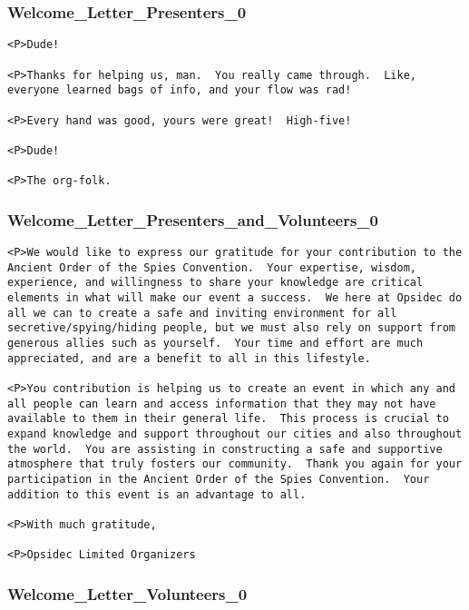 \documentclass[tablesignature]{scrartcl}
\begin{document}
\subsubsection{Welcome\_{}Letter\_{}Presenters\_{}0}
\label{sec-3_5_6}

\begin{verbatim}
<P>Dude!

<P>Thanks for helping us, man.  You really came through.  Like,
everyone learned bags of info, and your flow was rad!

<P>Every hand was good, yours were great!  High-five!

<P>Dude!

<P>The org-folk.
\end{verbatim}
\subsubsection{Welcome\_{}Letter\_{}Presenters\_{}and\_{}Volunteers\_{}0}
\label{sec-3_5_7}

\begin{verbatim}
<P>We would like to express our gratitude for your contribution to the
Ancient Order of the Spies Convention.  Your expertise, wisdom,
experience, and willingness to share your knowledge are critical
elements in what will make our event a success.  We here at Opsidec do
all we can to create a safe and inviting environment for all
secretive/spying/hiding people, but we must also rely on support from
generous allies such as yourself.  Your time and effort are much
appreciated, and are a benefit to all in this lifestyle.

<P>You contribution is helping us to create an event in which any and
all people can learn and access information that they may not have
available to them in their general life.  This process is crucial to
expand knowledge and support throughout our cities and also throughout
the world.  You are assisting in constructing a safe and supportive
atmosphere that truly fosters our community.  Thank you again for your
participation in the Ancient Order of the Spies Convention.  Your
addition to this event is an advantage to all.

<P>With much gratitude,

<P>Opsidec Limited Organizers
\end{verbatim}
\subsubsection{Welcome\_{}Letter\_{}Volunteers\_{}0}
\label{sec-3_5_8}
\end{document}
